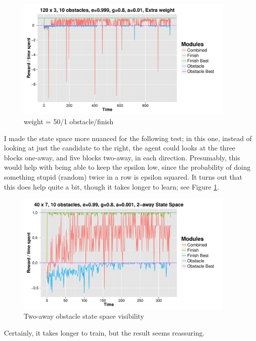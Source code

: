 \documentclass[11pt]{report}
\begin{document}
\begin{figure}[H]
  \centering
  \includegraphics[width=0.95\textwidth]{results/qlearn-s120x3-o10-w50.pdf}
  \caption{weight = 50/1 obstacle/finish}
\end{figure}

\noindent I made the state space more nuanced for the following test; in this one, instead of looking at just the candidate to the right, the agent could looks at the three blocks one-away, and five blocks two-away, in each direction. Presumably, this would help with being able to keep the epsilon low, since the probability of doing something stupid (random) twice in a row is epsilon squared. It turns out that this does help quite a bit, though it takes longer to learn; see Figure \ref{fig:two-away}.

\begin{figure}[H]
  \centering
  \includegraphics[width=0.95\textwidth]{results/qlearn-s40x7-o10-e99-directions.pdf}
  \caption{Two-away obstacle state space visibility}
  \label{fig:two-away}
\end{figure}

\noindent Certainly, it takes longer to train, but the result seems reassuring.
\end{document}

